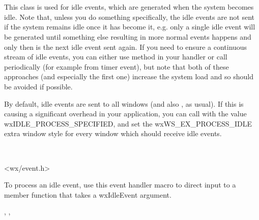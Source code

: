 \section{}\label{wxidleevent}

This class is used for idle events, which are generated when the system becomes
idle. Note that, unless you do something specifically, the idle events are not
sent if the system remains idle once it has become it, e.g. only a single idle
event will be generated until something else resulting in more normal events
happens and only then is the next idle event sent again. If you need to ensure
a continuous stream of idle events, you can either use 
 method in your handler or call 
 periodically (for example from timer
event), but note that both of these approaches (and especially the first one)
increase the system load and so should be avoided if possible.

By default, idle events are sent to all windows (and also 
, as usual). If this is causing a significant
overhead in your application, you can call  with
the value wxIDLE\_PROCESS\_SPECIFIED, and set the wxWS\_EX\_PROCESS\_IDLE extra
window style for every window which should receive idle events.


\\


<wx/event.h>


To process an idle event, use this event handler macro to direct input to a member
function that takes a wxIdleEvent argument.

\twocolwidtha{7cm}
\begin{twocollist}\itemsep=0pt
\end{twocollist}%


, , 


